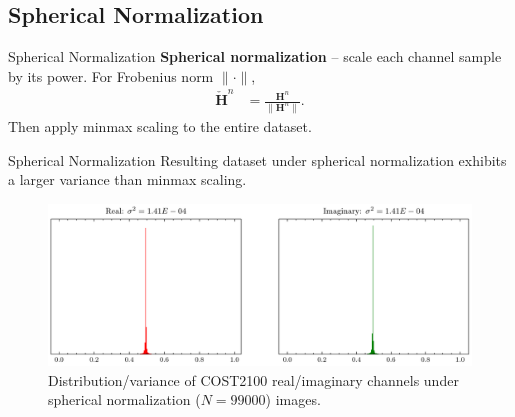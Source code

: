 \documentclass{beamer}
\newcommand{\fignocap}[2]{
	\begin{figure}[!hbtp]
	    \centering
		\texttt{[image: \#2]}
	\end{figure}
}
\begin{document}

\subsection{Spherical Normalization}
  \begin{frame}{Spherical Normalization}
    \textbf{Spherical normalization} -- scale each channel sample by its power. For Frobenius norm $\|\cdot\|$,
    \begin{align}
      \mathbf{\check H}^n &= \frac{\mathbf H^n}{\|\mathbf H^n\|}. \label{eq:sph-intro}
    \end{align}
    Then apply minmax scaling to the entire dataset.
  \end{frame}

  \begin{frame}{Spherical Normalization}
    Resulting dataset under spherical normalization exhibits a larger variance than minmax scaling. 
    \begin{figure}[htb]
      \centering
      \includegraphics[width=.9\textwidth]{cost2100_indoor_sph_dist.pdf}
      \caption{Distribution/variance of COST2100 real/imaginary channels under spherical normalization ($N=99000$) images.}
      \label{fig:cost_indoor_sph_dist}
    \end{figure}
  \end{frame}
\end{document}
